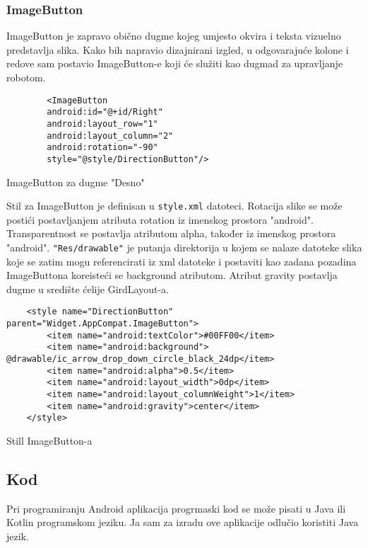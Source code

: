 \documentclass[../Document.tex]{subfiles}
\begin{document}
\subsubsection{ImageButton}
ImageButton je zapravo obično dugme kojeg umjesto okvira i teksta vizuelno predstavlja slika. Kako bih napravio dizajnirani izgled, u odgovarajuće kolone i redove sam postavio ImageButton-e koji će služiti kao dugmad za upravljanje robotom.


\begin{code}
    \begin{verbatim}
        <ImageButton
        android:id="@+id/Right"
        android:layout_row="1"
        android:layout_column="2"
        android:rotation="-90"
        style="@style/DirectionButton"/>
    \end{verbatim}
    \caption{ImageButton za dugme "Desno"}
\end{code}

\vspace{0.5cm}
\noindent Stil za ImageButton je definisan u \verb|style.xml| datoteci. Rotacija slike se može postići postavljanjem atributa rotation iz imenskog prostora "android". Transparentnost se postavlja atributom alpha, također iz imenskog prostora "android". \verb|"Res/drawable"| je putanja direktorija u kojem se nalaze datoteke slika koje se zatim mogu referencirati iz xml datoteke i postaviti kao zadana pozadina ImageButtona koreisteći se background atributom. Atribut gravity postavlja dugme u središte ćelije GirdLayout-a.\\

\begin{code}
    \begin{verbatim}
    <style name="DirectionButton" parent="Widget.AppCompat.ImageButton">
        <item name="android:textColor">#00FF00</item>
        <item name="android:background"> @drawable/ic_arrow_drop_down_circle_black_24dp</item>
        <item name="android:alpha">0.5</item>
        <item name="android:layout_width">0dp</item>
        <item name="android:layout_columnWeight">1</item>
        <item name="android:gravity">center</item>
    </style>
    \end{verbatim}
    \caption{Still ImageButton-a}
\end{code}

\subsection{Kod}
Pri programiranju Android aplikacija progrmaski  kod se može pisati u Java ili Kotlin programskom jeziku. Ja sam za izradu ove aplikacije odlučio koristiti Java jezik.
\end{document}
